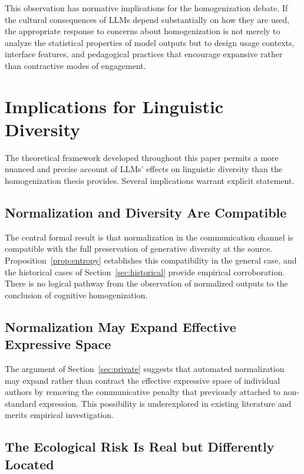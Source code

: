 \documentclass[12pt,a4paper]{article}
\theoremstyle{definition}
\theoremstyle{plain}
\theoremstyle{remark}
\begin{document}
This observation has normative implications for the homogenization debate. If the cultural
consequences of LLMs depend substantially on how they are used, the appropriate response to
concerns about homogenization is not merely to analyze the statistical properties of model
outputs but to design usage contexts, interface features, and pedagogical practices that
encourage expansive rather than contractive modes of engagement.

\section{Implications for Linguistic Diversity}
\label{sec:implications}

The theoretical framework developed throughout this paper permits a more nuanced and precise
account of LLMs' effects on linguistic diversity than the homogenization thesis provides.
Several implications warrant explicit statement.

\subsection{Normalization and Diversity Are Compatible}

The central formal result is that normalization in the communication channel is compatible
with the full preservation of generative diversity at the source. Proposition~\ref{prop:entropy}
establishes this compatibility in the general case, and the historical cases of
Section~\ref{sec:historical} provide empirical corroboration. There is no logical pathway
from the observation of normalized outputs to the conclusion of cognitive homogenization.

\subsection{Normalization May Expand Effective Expressive Space}

The argument of Section~\ref{sec:private} suggests that automated normalization may expand
rather than contract the effective expressive space of individual authors by removing the
communicative penalty that previously attached to non-standard expression. This possibility
is underexplored in existing literature and merits empirical investigation.

\subsection{The Ecological Risk Is Real but Differently Located}
\end{document}

